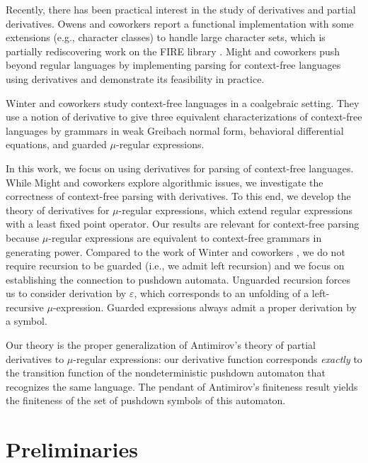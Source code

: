 \documentclass[runningheads, envcountsame, a4paper]{llncs}
\begin{document}
Recently, there has been practical interest in the study of
derivatives and partial derivatives. Owens and coworkers \cite{re-derivs}
report a functional implementation with some extensions (e.g., character classes) to handle large
character sets, which is partially rediscovering work on the FIRE
library \cite{DBLP:conf/wia/Watson96}. Might and coworkers
\cite{DBLP:conf/icfp/MightDS11,DBLP:conf/pldi/0001HM16} push beyond
regular languages by implementing parsing for
context-free languages using derivatives and demonstrate its
feasibility in practice. 

Winter and coworkers \cite{DBLP:conf/calco/WinterBR11} study
context-free languages in a coalgebraic setting. 
They use a notion of derivative to give
three equivalent characterizations of context-free languages by
grammars in weak Greibach normal form, behavioral differential
equations, and guarded $\mu$-regular expressions. 

In this work, we focus on using derivatives for parsing of
context-free languages. While Might and coworkers explore algorithmic
issues, we investigate the correctness of context-free parsing
with derivatives. To this end, we develop the theory of derivatives for $\mu$-regular expressions,
which extend regular expressions with a least fixed point operator. Our results are relevant for
context-free parsing because $\mu$-regular expressions are equivalent
to context-free grammars in generating power. Compared to the
work of Winter and coworkers \cite{DBLP:conf/calco/WinterBR11}, we do not require recursion to
be guarded (i.e., we admit left recursion) and we focus on establishing the connection to pushdown
automata. Unguarded recursion forces us to consider derivation by 
$\varepsilon$, which corresponds to an unfolding of a left-recursive
$\mu$-expression. Guarded expressions always admit a proper derivation
by a symbol.

Our theory is the proper generalization of Antimirov's theory of
partial derivatives to $\mu$-regular expressions: our derivative function 
corresponds \emph{exactly} to the transition function of the nondeterministic
pushdown automaton that recognizes the same language.
The pendant of Antimirov's finiteness result yields the finiteness of
the set of pushdown symbols of this automaton.


\section{Preliminaries}
\label{sec:preliminaries}
\end{document}
